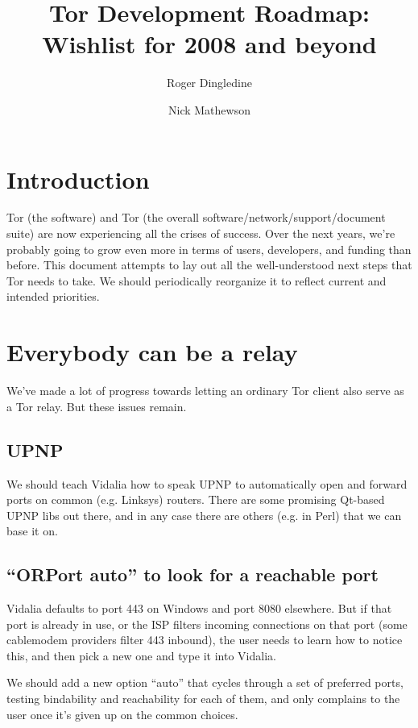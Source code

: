 \documentclass{article}
\begin{document}
\title{Tor Development Roadmap: Wishlist for 2008 and beyond}
\author{Roger Dingledine \and Nick Mathewson}

\maketitle
\pagestyle{plain}

\section{Introduction}

Tor (the software) and Tor (the overall software/network/support/document
suite) are now experiencing all the crises of success.  Over the next
years, we're probably going to grow even more in terms of users, developers,
and funding than before. This document attempts to lay out all the
well-understood next steps that Tor needs to take. We should periodically
reorganize it to reflect current and intended priorities.

\section{Everybody can be a relay}

We've made a lot of progress towards letting an ordinary Tor client also
serve as a Tor relay. But these issues remain.

\subsection{UPNP}

We should teach Vidalia how to speak UPNP to automatically open and
forward ports on common (e.g. Linksys) routers. There are some promising
Qt-based UPNP libs out there, and in any case there are others (e.g. in
Perl) that we can base it on.

\subsection{``ORPort auto'' to look for a reachable port}

Vidalia defaults to port 443 on Windows and port 8080 elsewhere. But if
that port is already in use, or the ISP filters incoming connections
on that port (some cablemodem providers filter 443 inbound), the user
needs to learn how to notice this, and then pick a new one and type it
into Vidalia.

We should add a new option ``auto'' that cycles through a set of preferred
ports, testing bindability and reachability for each of them, and only
complains to the user once it's given up on the common choices.
\end{document}

